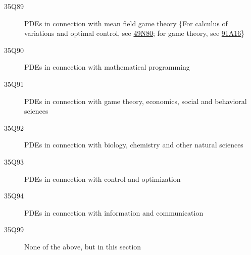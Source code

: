 \documentclass[letterpaper]{article}
\begin{document}
\begin{description}
\item [35Q89]\label{35Q89} PDEs in connection with mean field game theory \{For calculus of variations and optimal control, see \hyperref[49N80]{49N80}; for game theory, see \hyperref[91A16]{91A16}\}
\item [35Q90]\label{35Q90} PDEs in connection with mathematical programming
\item [35Q91]\label{35Q91} PDEs in connection with game theory, economics, social and behavioral sciences
\item [35Q92]\label{35Q92} PDEs in connection with biology, chemistry and other natural sciences
\item [35Q93]\label{35Q93} PDEs in connection with control and optimization
\item [35Q94]\label{35Q94} PDEs in connection with information and communication
\item [35Q99]\label{35Q99} None of the above, but in this section
\end{description}
\end{document}
